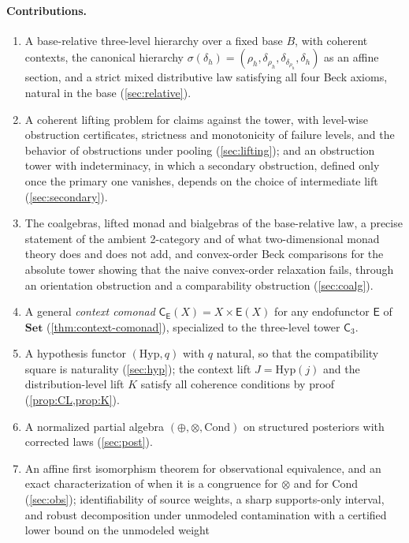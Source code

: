 \documentclass[11pt]{article}
\theoremstyle{definition}
\theoremstyle{remark}
\newcommand{\Set}{\mathbf{Set}}
\newcommand{\Hyp}{\mathrm{Hyp}}
\newcommand{\Cond}{\mathrm{Cond}}
\newcommand{\C}{\mathsf{C}}
\newcommand{\E}{\mathsf{E}}
\begin{document}
\paragraph{Contributions.}
\begin{enumerate}[leftmargin=*]
\item A base-relative three-level hierarchy over a fixed base $B$, with coherent contexts, the
  canonical hierarchy $\sigma(\delta_h)=(\rho_h,\delta_{\rho_h},\delta_{\delta_{\rho_h}},\delta_h)$ as an
  affine section, and a strict mixed distributive law satisfying all four Beck axioms, natural in the
  base (\cref{sec:relative}).
\item A coherent lifting problem for claims against the tower, with level-wise obstruction
  certificates, strictness and monotonicity of failure levels, and the behavior of obstructions under
  pooling (\cref{sec:lifting}); and an obstruction tower with indeterminacy, in which a secondary
  obstruction, defined only once the primary one vanishes, depends on the choice of intermediate lift
  (\cref{sec:secondary}).
\item The coalgebras, lifted monad and bialgebras of the base-relative law, a precise statement of
  the ambient 2-category and of what two-dimensional monad theory does and does not add, and
  convex-order Beck comparisons for the absolute tower showing that the naive convex-order
  relaxation fails, through an orientation obstruction and a comparability obstruction
  (\cref{sec:coalg}).
\item A general \emph{context comonad} $\C_\E(X)=X\times\E(X)$ for any endofunctor $\E$ of $\Set$
  (\cref{thm:context-comonad}), specialized to the three-level tower $\C_3$.
\item A hypothesis functor $(\Hyp,q)$ with $q$ natural, so that the compatibility square is
  naturality (\cref{sec:hyp}); the context lift $J=\Hyp(j)$ and the distribution-level lift $K$
  satisfy all coherence conditions by proof (\cref{prop:CL,prop:K}).
\item A normalized partial algebra $(\oplus,\otimes,\Cond)$ on structured posteriors with corrected
  laws (\cref{sec:post}).
\item An affine first isomorphism theorem for observational equivalence, and an exact
  characterization of when it is a congruence for $\otimes$ and for $\Cond$ (\cref{sec:obs});
  identifiability of source weights, a sharp supports-only interval, and robust decomposition under
  unmodeled contamination with a certified lower bound on the unmodeled weight

\end{enumerate}
\end{document}
